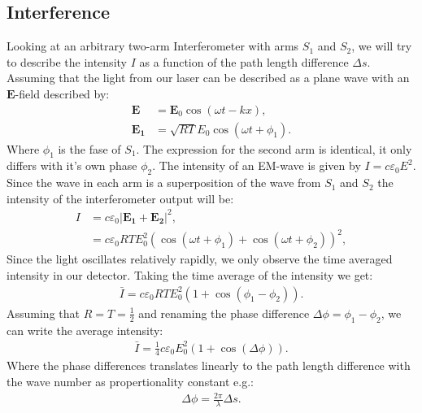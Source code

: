 \subsection{Interference}
Looking at an arbitrary two-arm Interferometer with arms $S_1$ and $S_2$, we will try to describe the intensity $I$ as a function of the path length difference $\Delta s$. Assuming that the light from our laser can be described as a plane wave with an  $\textbf{E}$-field described by:
%
\begin{align}
\mathbf{E} & =\mathbf{E}_0 \cos(\omega t-kx),
\label{efelt}\\
\mathbf{E_1} & = \sqrt{RT}E_0\cos(\omega t+\phi_1).
	\label{Earm}
\end{align}
%
Where $\phi_1$ is the fase of $S_1$. The expression for the second arm is identical, it only differs with it's own phase $\phi_2$. The intensity of an EM-wave is given by $I=c\varepsilon_0 E^2$. Since the wave in each arm is a superposition of the wave from $S_1$ and $S_2$ the intensity of the interferometer output will be:
%
\begin{align}
    I & = c\varepsilon_0 |\mathbf{E_1}+\mathbf{E_2}|^2, \nonumber\\
    & =c\varepsilon_0 RTE_{0}^2 (\cos(\omega t +\phi_1)+\cos(\omega t+\phi_2))^2,
\label{intensity1}
\end{align}
%
Since the light oscillates relatively rapidly, we only observe the time averaged intensity in our detector. Taking the time average of the intensity we get:
%
\begin{align}
\bar{I}=c\varepsilon_0 RTE_{0}^2(1+\cos(\phi_1-\phi_2)).
\label{intensityav1}
\end{align}
%
Assuming that $R=T=\frac{1}{2}$ and renaming the phase difference $\Delta \phi=\phi_1-\phi_2$, we can write the average intensity:
%
\begin{align}
    \bar{I}=\frac{1}{4}c\varepsilon_0 E_{0}^2(1+\cos(\Delta \phi)).
\label{intensityav2}
\end{align}
%
Where the phase differences translates linearly to the path length difference with the wave number as propertionality constant e.g.:
%
\begin{align}
    \Delta \phi = \frac{2\pi}{\lambda}\Delta s.
\label{phasetrans}
\end{align}
%
